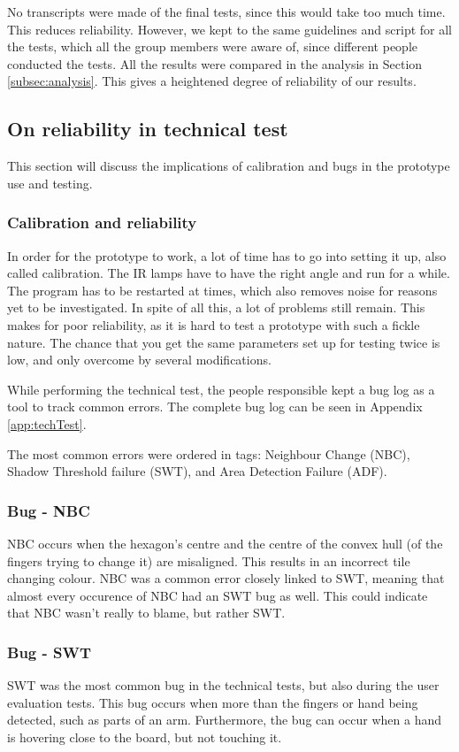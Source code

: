 No transcripts were made of the final tests, since this would take too much time. This reduces reliability. However, we kept to the same guidelines and script for all the tests, which all the group members were aware of, since different people conducted the tests. All the results were compared in the analysis in Section \ref{subsec:analysis}. This gives a heightened degree of reliability of our results.

\subsection{On reliability in technical test}
This section will discuss the implications of calibration and bugs in the prototype use and testing. 
\subsubsection*{Calibration and reliability}
In order for the prototype to work, a lot of time has to go into setting it up, also called calibration. The IR lamps have to have the right angle and run for a while. The program has to be restarted at times, which also removes noise for reasons yet to be investigated. In spite of all this, a lot of problems still remain. This makes for poor reliability, as it is hard to test a prototype with such a fickle nature. The chance that you get the same parameters set up for testing twice is low, and only overcome by several modifications.

While performing the technical test, the people responsible kept a bug log as a tool to track common errors. The complete bug log can be seen in Appendix \ref{app:techTest}.

The most common errors were ordered in tags: Neighbour Change (NBC), Shadow Threshold failure (SWT), and Area Detection Failure (ADF). 

\subsubsection*{Bug - NBC} 
NBC occurs when the hexagon's centre and the centre of the convex hull (of the fingers trying to change it) are misaligned. This results in an incorrect tile changing colour. NBC was a common error closely linked to SWT, meaning that almost every occurence of NBC had an SWT bug as well. This could indicate that NBC wasn't really to blame, but rather SWT.

\subsubsection*{Bug - SWT} 
SWT was the most common bug in the technical tests, but also during the user evaluation tests. This bug occurs when more than the fingers or hand being detected, such as parts of an arm. Furthermore, the bug can occur when a hand is hovering close to the board, but not touching it.

